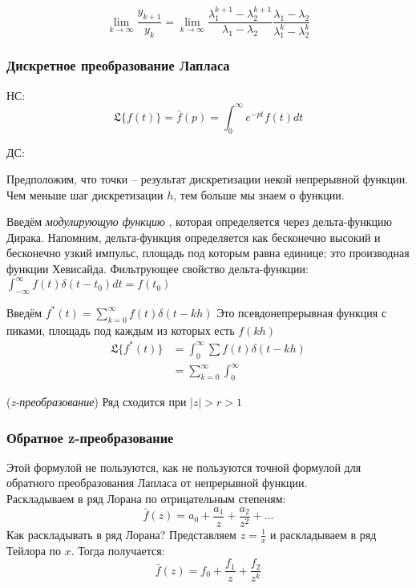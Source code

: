\documentclass[main.tex]{subfiles}
\begin{document}
\[ \lim\limits_{k \to \infty} \frac{y_{k+1}}{y_k} = \lim\limits_{k \to \infty} \frac{ \lambda_1^{k+1} - \lambda_2^{k+1} }{\lambda_1 - \lambda_2} \frac{ \lambda_1 - \lambda_2 }{\lambda_1^k - \lambda_2^k} \] %

\subsubsection{ Дискретное преобразование Лапласа }

НС:
\[ \mathfrak{L} \{f(t)\} = \bar f(p) = \int_{0}^{\infty} e^{-pt} f(t) dt \]

ДС:


Предположим, что точки -- результат дискретизации некой непрерывной функции.
Чем меньше шаг дискретизации $ h $, тем больше мы знаем о функции.

Введём \emph{ модулирующую функцию }, которая определяется через дельта-функцию Дирака.
Напомним, дельта-функция определяется как бесконечно высокий и бесконечно узкий импульс, площадь под которым равна единице; это производная функции Хевисайда.
Фильтрующее свойство дельта-функции: $ \int_{- \infty}^{\infty} f(t) \delta(t-t_0) dt = f(t_0) $

Введём $ f^*(t) = \sum_{k=0}^{\infty} f(t) \delta(t-kh) $
Это псевдонепрерывная функция с пиками, площадь под каждым из которых есть $ f(kh) $
\begin{align*}
	\mathfrak{L} \{ f^*(t) \} & = \int_{0}^{\infty} \sum f(t) \delta(t-kh) \\
	& = \sum_{k=0}^{\infty} \int_{0}^{\infty} %
\end{align*}

(\emph{z-преобразование})
Ряд сходится при $ |z| > r > 1 $

\subsubsection{ Обратное z-преобразование }


Этой формулой не пользуются, как не пользуются точной формулой для обратного преобразования Лапласа от непрерывной функции. \\

Раскладываем в ряд Лорана по отрицательным степеням:
\[ \bar f(z) = a_0 + \frac{a_1}{z} + \frac{a_2}{z^2} + ... \]
Как раскладывать в ряд Лорана?
Представляем $ z = \frac{1}{x} $ и раскладываем в ряд Тейлора по $ x $.
Тогда получается:
\[ \bar f(z) = f_0 + \frac{ f_1 }{ z } + \frac{f_2}{z^k} \] %
\end{document}
